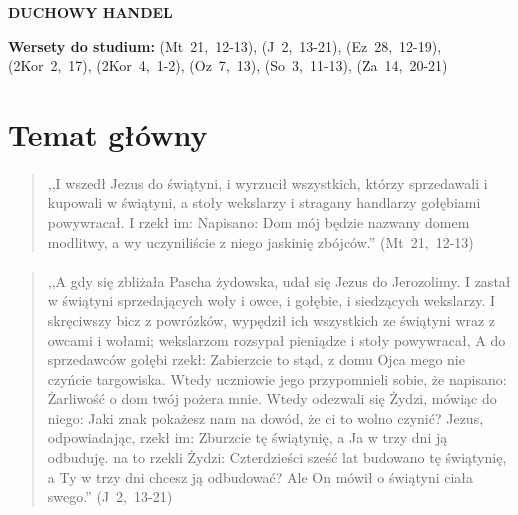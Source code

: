 \documentclass[10pt,a4paper,oneside]{article}
\begin{document}
\centerline{\textbf{\MakeUppercase{Duchowy handel}}}
\begin{center}
\textbf{Wersety do studium:} \mbox{(Mt 21, 12-13)}, \mbox{(J 2, 13-21)}, \mbox{(Ez 28, 12-19)}, \mbox{(2Kor 2, 17)}, \mbox{(2Kor 4, 1-2)}, \mbox{(Oz 7, 13)}, \mbox{(So 3, 11-13)}, \mbox{(Za 14, 20-21)}
\end{center}
\section{Temat główny}
\paragraph{}
\begin{quote}
,,I wszedł Jezus do świątyni, i wyrzucił wszystkich, którzy sprzedawali i kupowali w świątyni, a stoły wekslarzy i stragany handlarzy gołębiami powywracał. I rzekł im: Napisano: Dom mój będzie nazwany domem modlitwy, a wy uczyniliście z niego jaskinię zbójców.'' \mbox{(Mt 21, 12-13)}
\end{quote}
\paragraph{}
\begin{quote}
,,A gdy się zbliżała Pascha żydowska, udał się Jezus do Jerozolimy. I zastał w świątyni sprzedających woły i owce, i gołębie, i siedzących wekslarzy. I skręciwszy bicz z powrózków, wypędził ich wszystkich ze świątyni wraz z owcami i wołami; wekslarzom rozsypał pieniądze i stoły powywracał, A do sprzedawców gołębi rzekł: Zabierzcie to stąd, z domu Ojca mego nie czyńcie targowiska. Wtedy uczniowie jego przypomnieli sobie, że napisano: Żarliwość o dom twój pożera mnie. Wtedy odezwali się Żydzi, mówiąc do niego: Jaki znak pokażesz nam na dowód, że ci to wolno czynić? Jezus, odpowiadając, rzekł im: Zburzcie tę świątynię, a Ja w trzy dni ją odbuduję. na to rzekli Żydzi: Czterdzieści sześć lat budowano tę świątynię, a Ty w trzy dni chcesz ją odbudować? Ale On mówił o świątyni ciała swego.'' \mbox{(J 2, 13-21)}
\end{quote}
\end{document}
